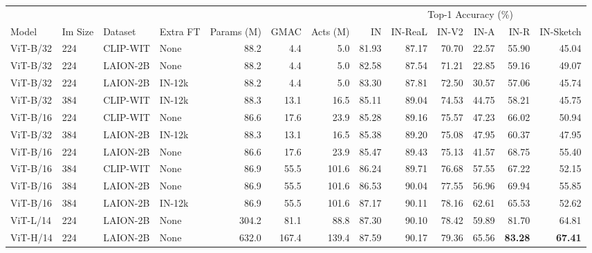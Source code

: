 \begin{appendix}
\begin{table}
\scriptsize
\centering
\setlength\tabcolsep{2.5pt}

\begin{tabular}{llllrrrrrrrrr}
\toprule
         & & & & & & & \multicolumn{6}{c}{Top-1 Accuracy (\%)} \\
   Model & Im Size &  Dataset & Extra FT & Params (M) & GMAC & Acts (M) &                 IN & IN-ReaL & IN-V2 &  IN-A &  IN-R & IN-Sketch \\
\midrule
ViT-B/32 &     224 & CLIP-WIT &     None &       88.2 &   4.4 &      5.0 &              81.93 &   87.17 & 70.70 & 22.57 & 55.90 &     45.04 \\
ViT-B/32 &     224 & LAION-2B &     None &       88.2 &   4.4 &      5.0 &              82.58 &   87.54 & 71.21 & 22.85 & 59.16 &     49.07 \\
ViT-B/32 &     224 & LAION-2B &   IN-12k &       88.2 &   4.4 &      5.0 &              83.30 &   87.81 & 72.50 & 30.57 & 57.06 &     45.74 \\
ViT-B/32 &     384 & CLIP-WIT &   IN-12k &       88.3 &  13.1 &     16.5 &              85.11 &   89.04 & 74.53 & 44.75 & 58.21 &     45.75 \\
ViT-B/16 &     224 & CLIP-WIT &     None &       86.6 &  17.6 &     23.9 &              85.28 &   89.16 & 75.57 & 47.23 & 66.02 &     50.94 \\
ViT-B/32 &     384 & LAION-2B &   IN-12k &       88.3 &  13.1 &     16.5 &              85.38 &   89.20 & 75.08 & 47.95 & 60.37 &     47.95 \\
ViT-B/16 &     224 & LAION-2B &     None &       86.6 &  17.6 &     23.9 &              85.47 &   89.43 & 75.13 & 41.57 & 68.75 &     55.40 \\
ViT-B/16 &     384 & CLIP-WIT &     None &       86.9 &  55.5 &    101.6 &              86.24 &   89.71 & 76.68 & 57.55 & 67.22 &     52.15 \\
ViT-B/16 &     384 & LAION-2B &     None &       86.9 &  55.5 &    101.6 &              86.53 &   90.04 & 77.55 & 56.96 & 69.94 &     55.85 \\
ViT-B/16 &     384 & LAION-2B &   IN-12k &       86.9 &  55.5 &    101.6 &              87.17 &   90.11 & 78.16 & 62.61 & 65.53 &     52.62 \\
ViT-L/14 &     224 & LAION-2B &     None &      304.2 &  81.1 &     88.8 &              87.30 &   90.10 & 78.42 & 59.89 & 81.70 &     64.81 \\
ViT-H/14 &     224 & LAION-2B &     None &      632.0 & 167.4 &    139.4 &              87.59 &   90.17 & 79.36 & 65.56 & \textbf{83.28} &     \textbf{67.41} \\

\end{tabular}
\end{table}
\end{appendix}
